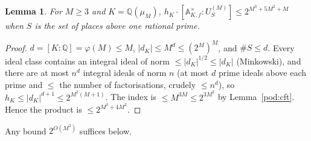 \documentclass[10pt]{amsart}
\newtheorem{lemma}[theorem]{Lemma}
\theoremstyle{definition}
\theoremstyle{remark}
\newcommand{\Q}{\mathbb Q}
\begin{document}
\begin{lemma}\label{pod:hK}
For $M\ge3$ and $K=\Q(\mu_M)$, $h_K\cdot[\mathbb A_{K,f}^\times:U_S^{(M)}]\le2^{M^3+5M^2+M}$ when
$S$ is the set of places above one rational prime.
\end{lemma}
\begin{proof}
$d=[K:\Q]=\varphi(M)\le M$, $|d_K|\le M^d\le(2^M)^M$, and $\#S\le d$. Every ideal class contains an
integral ideal of norm $\le|d_K|^{1/2}\le|d_K|$ (Minkowski), and there are at most $n^d$ integral
ideals of norm $n$ (at most $d$ prime ideals above each prime and $\le$ the number of factorisations,
crudely $\le n^d$), so $h_K\le|d_K|^{d+1}\le2^{M^2(M+1)}$. The index is $\le M^{3M}\le2^{3M^2}$ by
Lemma~\ref{pod:cft}. Hence the product is $\le2^{M^3+4M^2}$.
\end{proof}
Any bound $2^{O(M^3)}$ suffices below.
\end{document}
